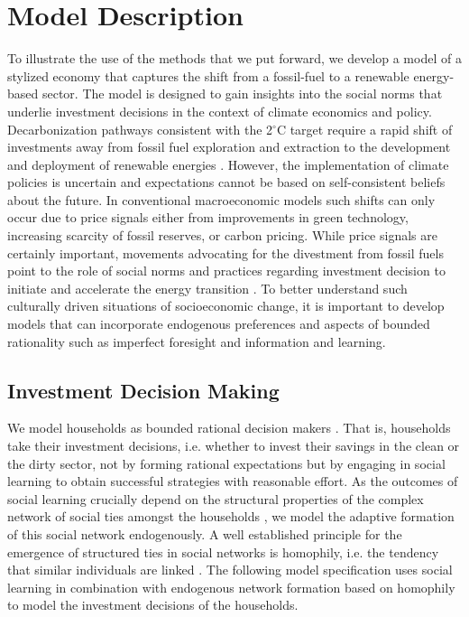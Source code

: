 \section{Model Description}
\label{sec:Model_Description}

To illustrate the use of the methods that we put forward, we develop a model of a stylized economy that captures the shift from a fossil-fuel to a renewable energy-based sector.
The model is designed to gain insights into the social norms that underlie investment decisions in the context of climate economics and policy.
Decarbonization pathways consistent with the 2$^{\circ}$C target require a rapid shift of investments away from fossil fuel exploration and extraction to the development and deployment of renewable energies \citep{IPCC2014}.
However, the implementation of climate policies is uncertain and expectations cannot be based on self-consistent beliefs about the future. 
In conventional macroeconomic models such shifts can only occur due to price signals either from improvements in green technology, increasing scarcity of fossil reserves, or carbon pricing.
While price signals are certainly important, movements advocating for the divestment from fossil fuels point to the role of social norms and practices regarding investment decision to initiate and accelerate the energy transition \citep{Ans2013}.
To better understand such culturally driven situations of socioeconomic change, it is important to develop models that can incorporate endogenous preferences and aspects of bounded rationality such as imperfect foresight and information and learning.



\subsection{Investment Decision Making}
\label{sec:investment_decision_making_descr.}

We model households as bounded rational decision makers \cite{simon1972theories, simon1982models, gigerenzer2002bounded}.
That is, households take their investment decisions, i.e. whether to invest their savings in the clean or the dirty sector, not by forming rational expectations \cite{Evans2006, Kirman2014} but by engaging in social learning \cite{bandura1977} to obtain successful strategies \cite{Traulsen2010} with reasonable effort.
As the outcomes of social learning crucially depend on the structural properties of the complex network of social ties amongst the households \cite{Barkoczi2016}, we model the adaptive formation of this social network endogenously.
A well established principle for the emergence of structured ties in social networks is homophily, i.e. the tendency that similar individuals are linked \cite{McPherson2007, Centola2007, Centola2011}.
The following model specification uses social learning in combination with endogenous network formation based on homophily to model the investment decisions of the households.

